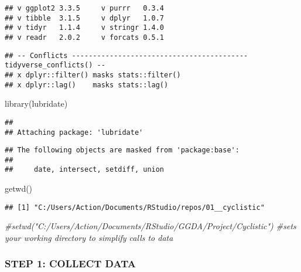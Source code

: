 \documentclass[
]{article}
\newenvironment{Shaded}{\begin{snugshade}}{\end{snugshade}}
\newcommand{\CommentTok}[1]{\textcolor[rgb]{0.56,0.35,0.01}{\textit{#1}}}
\newcommand{\FunctionTok}[1]{\textcolor[rgb]{0.00,0.00,0.00}{#1}}
\newcommand{\NormalTok}[1]{#1}
\begin{document}
\begin{verbatim}
## v ggplot2 3.3.5     v purrr   0.3.4
## v tibble  3.1.5     v dplyr   1.0.7
## v tidyr   1.1.4     v stringr 1.4.0
## v readr   2.0.2     v forcats 0.5.1
\end{verbatim}

\begin{verbatim}
## -- Conflicts ------------------------------------------ tidyverse_conflicts() --
## x dplyr::filter() masks stats::filter()
## x dplyr::lag()    masks stats::lag()
\end{verbatim}

\begin{Shaded}
\begin{Highlighting}[]
\FunctionTok{library}\NormalTok{(lubridate)}
\end{Highlighting}
\end{Shaded}

\begin{verbatim}
## 
## Attaching package: 'lubridate'
\end{verbatim}

\begin{verbatim}
## The following objects are masked from 'package:base':
## 
##     date, intersect, setdiff, union
\end{verbatim}

\begin{Shaded}
\begin{Highlighting}[]
\FunctionTok{getwd}\NormalTok{()}
\end{Highlighting}
\end{Shaded}

\begin{verbatim}
## [1] "C:/Users/Action/Documents/RStudio/repos/01__cyclistic"
\end{verbatim}

\begin{Shaded}
\begin{Highlighting}[]
\CommentTok{\#setwd("C:/Users/Action/Documents/RStudio/GGDA/Project/Cyclistic") \#sets your working directory to simplify calls to data}
\end{Highlighting}
\end{Shaded}

\hypertarget{step-1-collect-data}{%
\subsubsection{STEP 1: COLLECT DATA}\label{step-1-collect-data}}
\end{document}
